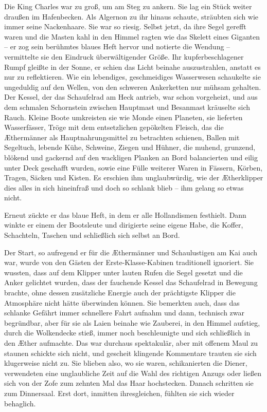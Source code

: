 Die King Charles war zu groß, um am Steg zu ankern. Sie lag ein
Stück weiter draußen im Hafenbecken. Als Algernon zu ihr hinaus
schaute, sträubten sich wie immer seine Nackenhaare. Sie war so
riesig. Selbst jetzt, da ihre Segel gerefft waren und die Masten
kahl in den Himmel ragten wie das Skelett eines Giganten – er zog
sein berühmtes blaues Heft hervor und notierte die Wendung –
vermittelte sie den Eindruck überwältigender Größe. Ihr
kupferbeschlagener Rumpf gleißte in der Sonne, er schien das Licht
beinahe auszustrahlen, anstatt es nur zu reflektieren. Wie ein
lebendiges, geschmeidiges Wasserwesen schaukelte sie ungeduldig auf
den Wellen, von den schweren Ankerketten nur mühsam gehalten. Der
Kessel, der das Schaufelrad am Heck antrieb, war schon vorgeheizt,
und aus dem schmalen Schornstein zwischen Hauptmast und Besanmast
kräuselte sich Rauch. Kleine Boote umkreisten sie wie Monde einen
Planeten, sie lieferten Wasserfässer, Tröge mit dem entsetzlichen
gepökelten Fleisch, das die Æthermänner als Hauptnahrungsmittel zu
betrachten schienen, Ballen mit Segeltuch, lebende Kühe, Schweine,
Ziegen und Hühner, die muhend, grunzend, blökend und gackernd auf
den wackligen Planken an Bord balancierten und eilig unter Deck
geschafft wurden, sowie eine Fülle weiterer Waren in Fässern,
Körben, Tragen, Säcken und Kisten. Es erschien ihm unglaubwürdig,
wie der Ætherklipper dies alles in sich hineinfraß und doch so
schlank blieb – ihm gelang so etwas nicht.

Erneut zückte er das blaue Heft, in dem er alle Hollandismen
festhielt. Dann winkte er einem der Bootsleute und dirigierte seine
eigene Habe, die Koffer, Schachteln, Taschen und schließlich sich
selbst an Bord.

\bigpar

Der Start, so aufregend er für die Æthermänner und Schaulustigen am
Kai auch war, wurde von den Gästen der Erste-Klasse-Kabinen
traditionell ignoriert. Sie wussten, dass auf dem Klipper unter
lauten Rufen die Segel gesetzt und die Anker gelichtet wurden, dass
der fauchende Kessel das Schaufelrad in Bewegung brachte, ohne
dessen zusätzliche Energie auch der prächtigste Klipper die
Atmosphäre nicht hätte überwinden können. Sie bemerkten auch, dass
das schlanke Gefährt immer schnellere Fahrt aufnahm und dann,
technisch zwar begründbar, aber für sie als Laien beinahe wie
Zauberei, in den Himmel aufstieg, durch die Wolkendecke stieß,
immer noch beschleunigte und sich schließlich in den Æther
aufmachte. Das war durchaus spektakulär, aber mit offenem Maul zu
staunen schickte sich nicht, und gescheit klingende Kommentare
trauten sie sich klugerweise nicht zu. Sie blieben also, wo sie
waren, schikanierten die Diener, verwendeten eine unglaubliche Zeit
auf die Wahl des richtigen Anzugs oder ließen sich von der Zofe zum
zehnten Mal das Haar hochstecken. Danach schritten sie zum
Dinnersaal. Erst dort, inmitten ihresgleichen, fühlten sie sich
wieder behaglich.

